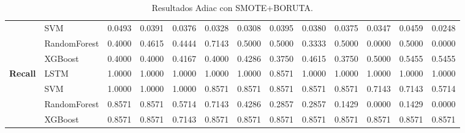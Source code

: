 \begin{table}[H]
\begin{adjustbox}{max width=12cm}
\begin{tabular}{|c|l|r|r|r|r|r|r|r|r|r|r|r|}
			& SVM &  0.0493 &  0.0391 &  0.0376 &  0.0328 &  0.0308 &  0.0395 &  0.0380 &  0.0375 &  0.0347 &  0.0459 &  0.0248 \\
			& RandomForest &  0.4000 &  0.4615 &  0.4444 &  0.7143 &  0.5000 &  0.5000 &  0.3333 &  0.5000 &  0.0000 &  0.5000 &  0.0000 \\
			& XGBoost &  0.4000 &  0.4000 &  0.4167 &  0.4000 &  0.4286 &  0.3750 &  0.4615 &  0.3750 &  0.5000 &  0.5455 &  0.5455 \\
			\hline
			\textbf{Recall} & LSTM &  1.0000 &  1.0000 &  1.0000 &  1.0000 &  1.0000 &  0.8571 &  1.0000 &  1.0000 &  1.0000 &  1.0000 &  1.0000 \\
			& SVM &  1.0000 &  1.0000 &  1.0000 &  0.8571 &  0.8571 &  0.8571 &  0.8571 &  0.8571 &  0.7143 &  0.7143 &  0.5714 \\
			& RandomForest &  0.8571 &  0.8571 &  0.5714 &  0.7143 &  0.4286 &  0.2857 &  0.2857 &  0.1429 &  0.0000 &  0.1429 &  0.0000 \\
			& XGBoost &  0.8571 &  0.8571 &  0.7143 &  0.8571 &  0.8571 &  0.8571 &  0.8571 &  0.8571 &  0.8571 &  0.8571 &  0.8571 \\
			\hline
		\end{tabular}
	\end{adjustbox}
	\caption{Resultados Adiac con SMOTE+BORUTA.}
	\label{tab:Adiac_SMOTE_BORUTA}
\end{table}

